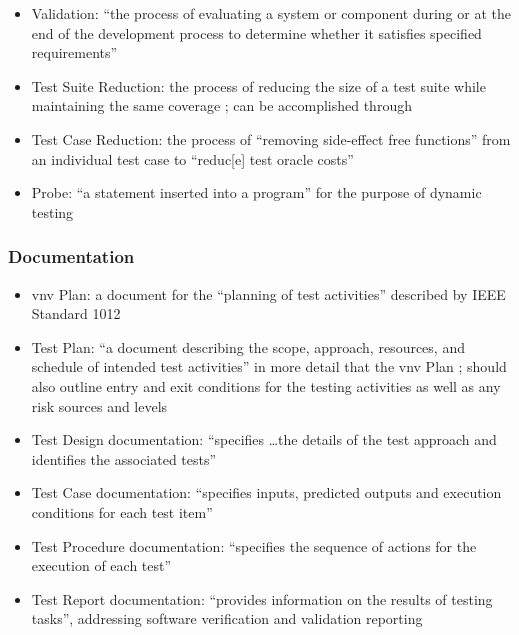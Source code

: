 \begin{itemize}
      \item Validation: ``the process of evaluating a system or component
            during or at the end of the development process to determine
            whether it satisfies specified requirements''
            \citep[p.~400]{vanVliet2000}
      \item Test Suite Reduction: the process of reducing the size of a test
            suite while maintaining the same coverage
            \citep[p.~519]{BarrEtAl2015}; can be accomplished through
      \item Test Case Reduction: the process of ``removing side-effect free
            functions'' from an individual test case to ``reduc[e] test oracle
            costs'' \citep[p.~519]{BarrEtAl2015}
      \item Probe: ``a statement inserted into a program'' for the purpose of
            dynamic testing \citep[p.~438]{PetersAndPedrycz2000}
\end{itemize}

\subsubsection{Documentation}

\begin{itemize}
      \item \acf{vnv} Plan: a document for the ``planning of test activities''
            described by IEEE Standard 1012 \citep[p.~411]{vanVliet2000}
      \item Test Plan: ``a document describing the scope, approach, resources,
            and schedule of intended test activities'' in more detail that the
            \acs{vnv} Plan \citep[pp.~412-413]{vanVliet2000};
            should also outline entry and exit conditions for the testing
            activities as well as any risk sources and levels
            \citep[p.~445]{PetersAndPedrycz2000}
      \item Test Design documentation: ``specifies \dots the details of the
            test approach and identifies the associated tests''
            \citep[p.~413]{vanVliet2000}
      \item Test Case documentation: ``specifies inputs, predicted outputs and
            execution conditions for each test item''
            \citep[p.~413]{vanVliet2000}
      \item Test Procedure documentation: ``specifies the sequence of actions
            for the execution of each test'' \citep[p.~413]{vanVliet2000}
      \item Test Report documentation: ``provides information on the results of
            testing tasks'', addressing software verification and validation
            reporting \citep[p.~413]{vanVliet2000}
\end{itemize}

